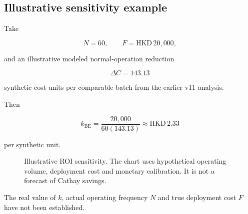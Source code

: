 \documentclass[10pt,a4paper]{article}
\theoremstyle{plain}
\theoremstyle{definition}
\theoremstyle{remark}
\begin{document}
\subsection{Illustrative sensitivity example}

Take

\[
N=60,
\qquad
F=\mathrm{HKD}\,20{,}000,
\]

and an illustrative
modeled normal-operation reduction

\[
\Delta C=143.13
\]

synthetic cost units per comparable batch
from the earlier v11 analysis.

Then

\begin{equation}
k_{\mathrm{BE}}
=
\frac{20{,}000}{60(143.13)}
\approx
\mathrm{HKD}\,2.33
\end{equation}

per synthetic unit.

\begin{figure}[!htbp]
\centering


\caption{
Illustrative ROI sensitivity.
The chart uses hypothetical
operating volume, deployment cost
and monetary calibration.
It is not a forecast of Cathay savings.
}
\label{fig:roi}
\end{figure}

The real value of \(k\),
actual operating frequency \(N\)
and true deployment cost \(F\)
have not been established.
\end{document}
